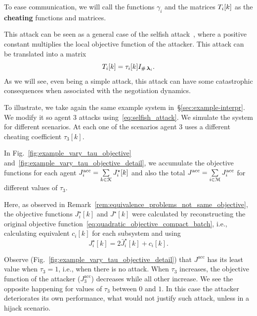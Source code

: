 \documentclass[../main.tex]{subfiles}
\begin{document}
To ease communication, we will call the functions $\gamma_{i}$ and the matrices $T_{i}[k]$ as the \textbf{cheating} functions and matrices.

This attack can be seen as a general case of the selfish attack~\cite{VelardeEtAl2018},
where a positive constant multiplies the local objective function of the attacker.
This attack can be translated into a matrix
\begin{equation}
  \label{eq:selfish_attack}
  T_{i}[k]=\tau_{i}[k] I_{\operatorname{\#}{\boldsymbol{\lambda}_i}}.
\end{equation}
As we will see, even being a simple attack, this attack can have some catastrophic consequences when associated with the negotiation dynamics.

To illustrate, we take again the same example system in~\S\ref{sec:example-interpr}.
We modify it so agent $3$ attacks using~\eqref{eq:selfish_attack}.
We simulate the system for different scenarios.
At each one of the scenarios agent $3$ uses a different cheating coefficient $\tau_{3}[k]$.
\newcommand{\Jacc}{J^{\text{acc}}}
\newcommand{\Jiacc}[1][i]{J_{#1}^{\text{acc}}}

In Fig.~\ref{fig:example_vary_tau_objective} and~\ref{fig:example_vary_tau_objective_detail}, we accumulate the objective functions for each agent ${\Jiacc=\sum\limits_{k\in\set{K}}J_{i}^{\star}[k]}$ and also the total ${\Jacc=\sum\limits_{i\in\set{M}}J_{i}^{\text{acc}}}$ for different values of $\tau_{3}$.

\begin{remark}
  Here, as observed in Remark~\ref{rem:equivalence_problems_not_same_objective}, the objective functions $J_{i}^{\star}[k]$ and $J^{\star}[k]$ were calculated by reconstructing the original objective function~\eqref{eq:quadratic_objective_compact_batch}, i.e., calculating equivalent $c_{i}[k]$ for each subsystem and using
  \begin{equation}
    J_{i}^{\star}[k] = 2\bar{J}_{i}^{\star}[k] + c_{i}[k].
\end{equation}
\end{remark}

Observe (Fig.~\ref{fig:example_vary_tau_objective_detail}) that $\Jacc$ has its least value when $\tau_{3}=1$, i.e., when there is no attack.
When $\tau_{3}$ increases, the objective function of the attacker ($\Jiacc[3]$) decreases while all other increase.
We see the opposite happening for values of $\tau_{3}$ between $0$ and $1$.
In this case the attacker deteriorates its own performance, what would not justify such attack, unless in a hijack scenario.
\end{document}
